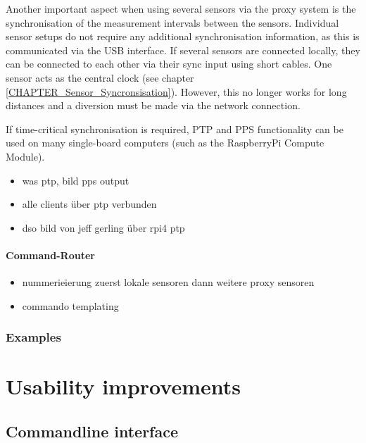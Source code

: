 Another important aspect when using several sensors via the proxy system
is the synchronisation of the measurement intervals between the sensors.
Individual sensor setups do not require any additional synchronisation
information, as this is communicated via the USB interface. If several
sensors are connected locally, they can be connected to each other via
their sync input using short cables. One sensor acts as the central
clock (see chapter \ref{CHAPTER_Sensor_Syncronsisation}). However, this
no longer works for long distances and a diversion must be made via the
network connection.

If time-critical synchronisation is required, PTP and PPS functionality
can be used on many single-board computers (such as the RaspberryPi
Compute Module).

\begin{itemize}
\tightlist
\item
  was ptp, bild pps output
\item
  alle clients über ptp verbunden
\item
  dso bild von jeff gerling über rpi4 ptp
\end{itemize}

\hypertarget{command-router}{%
\subsubsection{Command-Router}\label{command-router}}

\begin{itemize}
\tightlist
\item
  nummerieierung zuerst lokale sensoren dann weitere proxy sensoren
\item
  commando templating
\end{itemize}

\hypertarget{examples}{%
\subsection{Examples}\label{examples}}

\hypertarget{usability-improvements}{%
\chapter{Usability improvements}\label{usability-improvements}}

\hypertarget{commandline-interface}{%
\section{Commandline interface}\label{commandline-interface}}

